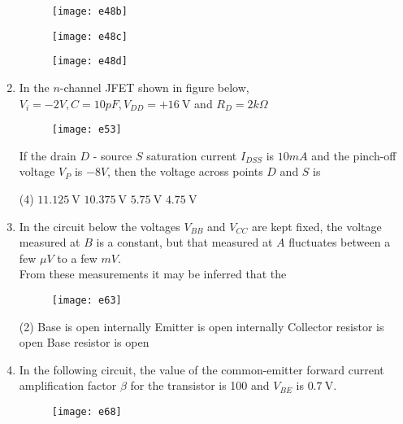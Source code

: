 \begin{enumerate}
\begin{tasks}
\begin{figure}[H]
			\centering
			\texttt{[image: e48b]}
		\end{figure}
		\task[\textbf{C.}] \begin{figure}[H]
			\centering
			\texttt{[image: e48c]}
		\end{figure}
		\task[\textbf{D.}] \begin{figure}[H]
			\centering
			\texttt{[image: e48d]}
		\end{figure}
	\end{tasks}
	\item In the $n$-channel JFET shown in figure below, $V_{i}=-2 V, C=10 p F, V_{D D}=+16 \mathrm{~V}$ and $R_{D}=2 k \Omega$\\
	\begin{figure}[H]
		\centering
		\texttt{[image: e53]}
	\end{figure}
	If the drain $D$ - source $S$ saturation current $I_{D S S}$ is $10 m A$ and the pinch-off voltage $V_{P}$ is $-8 V$, then the voltage across points $D$ and $S$ is
	{	}
	\begin{tasks}(4)
		\task[\textbf{A.}] $11.125 \mathrm{~V}$
		\task[\textbf{B.}] $10.375 \mathrm{~V}$
		\task[\textbf{C.}] $5.75 \mathrm{~V}$
		\task[\textbf{D.}] $4.75 \mathrm{~V}$
	\end{tasks}
	\item In the circuit below the voltages $V_{B B}$ and $V_{C C}$ are kept fixed, the voltage measured at $B$ is a constant, but that measured at $A$ fluctuates between a few $\mu V$ to a few $m V$.\\
	From these measurements it may be inferred that the
	{}
	\begin{figure}[H]
		\centering
		\texttt{[image: e63]}
	\end{figure}
	\begin{tasks}(2)
		\task[\textbf{A.}] Base is open internally
		\task[\textbf{B.}] Emitter is open internally
		\task[\textbf{C.}] Collector resistor is open
		\task[\textbf{D.}] Base resistor is open
	\end{tasks}
	\item In the following circuit, the value of the common-emitter forward current amplification factor $\beta$ for the transistor is 100 and $V_{B E}$ is $0.7 \mathrm{~V}$.\\
	\begin{figure}[H]
		\centering
		\texttt{[image: e68]}

\end{figure}
\end{enumerate}

